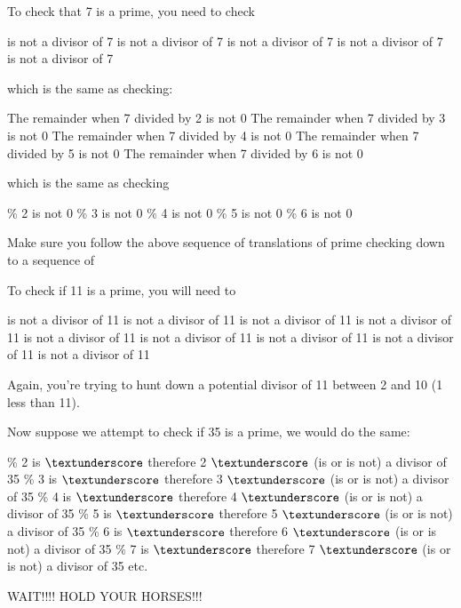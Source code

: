To check that 7 is a prime, you need to check
\begin{tightlist}
 is not a divisor of 7
\li is not a divisor of 7
\li is not a divisor of 7
\li is not a divisor of 7
\li is not a divisor of 7
\end{tightlist}
which is the same as checking:
\begin{tightlist}
\li The remainder when 7 divided by 2 is not 0
\li The remainder when 7 divided by 3 is not 0
\li The remainder when 7 divided by 4 is not 0
\li The remainder when 7 divided by 5 is not 0
\li The remainder when 7 divided by 6 is not 0
\end{tightlist}
which is the same as checking
\begin{tightlist}
 \% 2 is not 0
 \% 3 is not 0
 \% 4 is not 0
 \% 5 is not 0
 \% 6 is not 0
\end{tightlist}
Make sure you follow the above sequence of translations of prime
checking down to a sequence of %

%
To check if 11 is a prime, you will need to
\begin{tightlist}
 is not a divisor of 11
 is not a divisor of 11
 is not a divisor of 11
 is not a divisor of 11
 is not a divisor of 11
 is not a divisor of 11
 is not a divisor of 11
 is not a divisor of 11
 is not a divisor of 11
\end{tightlist}
Again, you're trying to hunt down a potential divisor of 11 between 2 and
10 (1 less than 11).

%
%

Now suppose we attempt to check if 35 is a prime, we would do the
same:
\begin{tightlist}
 \% 2 is $\textunderscore$ therefore 2 $\textunderscore$ (is or is not) a divisor of 35
 \% 3 is $\textunderscore$ therefore 3 $\textunderscore$ (is or is not) a divisor of 35
 \% 4 is $\textunderscore$ therefore 4 $\textunderscore$ (is or is not) a divisor of 35
 \% 5 is $\textunderscore$ therefore 5 $\textunderscore$ (is or is not) a divisor of 35
 \% 6 is $\textunderscore$ therefore 6 $\textunderscore$ (is or is not) a divisor of 35
 \% 7 is $\textunderscore$ therefore 7 $\textunderscore$ (is or is not) a divisor of 35
\li etc.
\end{tightlist}
WAIT!!!! HOLD YOUR HORSES!!!

